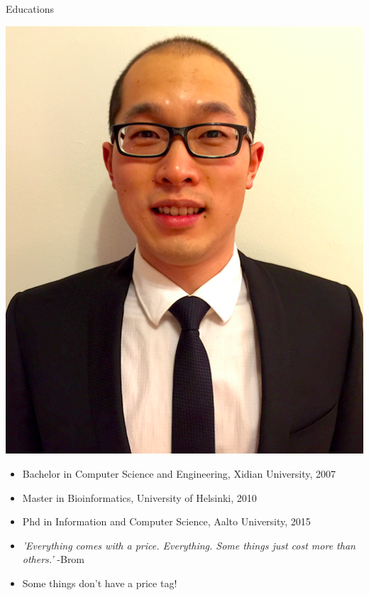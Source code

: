 \documentclass[first=dgreen,second=purple,logo=yellowexc]{aaltoslides}
\begin{document}
\begin{frame}{Educations}
\begin{center}
		\includegraphics[scale = 0.15]{./plots/photo3.png}
	\end{center}
	\begin{itemize}
		\item Bachelor in Computer Science and Engineering, Xidian University, 2007
		\item Master in Bioinformatics, University of Helsinki, 2010
		\item Phd in Information and Computer Science, Aalto University, 2015
		\item {\em 'Everything comes with a price. Everything. Some things just cost more than others.'} -Brom
		\item Some things don't have a price tag!
	\end{itemize}
\end{frame}
\end{document}
